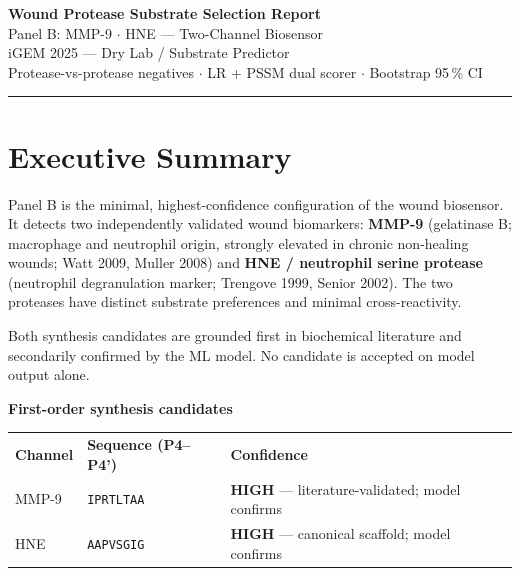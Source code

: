 \documentclass[10pt,a4paper]{article}
\newcommand{\seq}[1]{\texttt{#1}}
\newcommand{\hi}[1]{\textcolor{highgreen}{\textbf{#1}}}
\begin{document}
\begin{center}
  {\LARGE\bfseries Wound Protease Substrate Selection Report}\\[4pt]
  {\large Panel B: MMP-9 $\cdot$ HNE --- Two-Channel Biosensor}\\[2pt]
  {\small\color{gray} iGEM 2025 --- Dry Lab / Substrate Predictor}\\[1pt]
  {\small\color{gray} Protease-vs-protease negatives $\cdot$ LR + PSSM dual scorer $\cdot$ Bootstrap 95\,\% CI}
\end{center}

\vspace{0.5em}\hrule\vspace{0.8em}

\section{Executive Summary}

Panel B is the minimal, highest-confidence configuration of the wound
biosensor.  It detects two independently validated wound biomarkers:
\textbf{MMP-9} (gelatinase B; macrophage and neutrophil origin,
strongly elevated in chronic non-healing wounds; Watt 2009, Muller 2008)
and \textbf{HNE / neutrophil serine protease} (neutrophil degranulation
marker; Trengove 1999, Senior 2002).  The two proteases have distinct
substrate preferences and minimal cross-reactivity.

Both synthesis candidates are grounded first in biochemical literature and
secondarily confirmed by the ML model.  No candidate is accepted on model
output alone.

\medskip
\begin{tcolorbox}[colback=boxgreen,colframe=green!50,boxrule=0.5pt]
\textbf{First-order synthesis candidates}\\[2pt]
\begin{tabular}{lll}
  \textbf{Channel} & \textbf{Sequence (P4--P4')} & \textbf{Confidence}\\
  MMP-9 & \seq{IPRTLTAA} & \hi{HIGH} --- literature-validated; model confirms\\
  HNE   & \seq{AAPVSGIG} & \hi{HIGH} --- canonical scaffold; model confirms\\
\end{tabular}
\end{tcolorbox}

\end{document}
